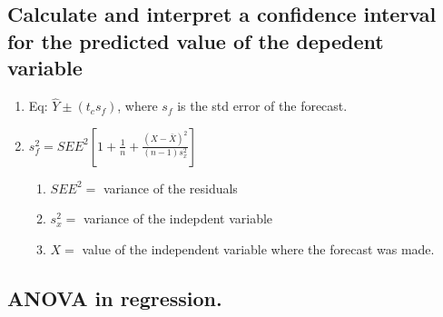 \documentclass{article}
\begin{document}
\subsection{Calculate and interpret a confidence interval for the predicted 
value of the depedent variable}
\begin{enumerate}
    \item Eq: $\hat{Y}\pm(t_c s_f)$, where $s_f$ is the {\color{red}std error of the forecast.}
    \item $s_f^2=SEE^2 \left[1+\frac{1}{n}+\frac{(X-\bar X)^2}{(n-1)s_x^2} \right]$
        \begin{enumerate}
            \item $SEE^2=$ variance of the residuals
            \item $s_x^2=$ variance of the indepdent variable
            \item $X =$ value of the independent variable where the forecast was
                made.
        \end{enumerate}
\end{enumerate}
\subsection{ANOVA in regression.}
\end{document}
